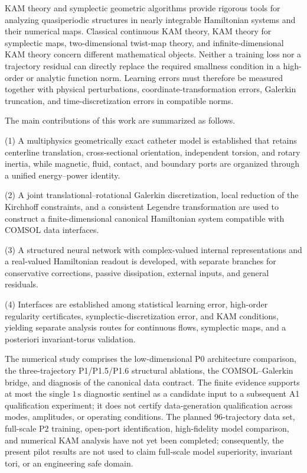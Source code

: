 KAM theory and symplectic geometric algorithms provide rigorous tools for analyzing quasiperiodic structures in nearly integrable Hamiltonian systems and their numerical maps\cite{FengQin2010,Shang1999KAMAlgorithms,Shang2000KAMMappings,Haro2016Parameterization,Arnold1989ClassicalMechanics,Coquinot2020Metriplectic,Moser1962InvariantCurves,Kuksin1993InfiniteDimensionalKAM,Poschel2001KAMLecture}. Classical continuous KAM theory, KAM theory for symplectic maps, two-dimensional twist-map theory, and infinite-dimensional KAM theory concern different mathematical objects. Neither a training loss nor a trajectory residual can directly replace the required smallness condition in a high-order or analytic function norm. Learning errors must therefore be measured together with physical perturbations, coordinate-transformation errors, Galerkin truncation, and time-discretization errors in compatible norms.

The main contributions of this work are summarized as follows.

(1) A multiphysics geometrically exact catheter model is established that retains centerline translation, cross-sectional orientation, independent torsion, and rotary inertia, while magnetic, fluid, contact, and boundary ports are organized through a unified energy--power identity.

(2) A joint translational--rotational Galerkin discretization, local reduction of the Kirchhoff constraints, and a consistent Legendre transformation are used to construct a finite-dimensional canonical Hamiltonian system compatible with COMSOL data interfaces.

(3) A structured neural network with complex-valued internal representations and a real-valued Hamiltonian readout is developed, with separate branches for conservative corrections, passive dissipation, external inputs, and general residuals.

(4) Interfaces are established among statistical learning error, high-order regularity certificates, symplectic-discretization error, and KAM conditions, yielding separate analysis routes for continuous flows, symplectic maps, and a posteriori invariant-torus validation.

The numerical study comprises the low-dimensional P0 architecture comparison, the three-trajectory P1/P1.5/P1.6 structural ablations, the COMSOL--Galerkin bridge, and diagnosis of the canonical data contract. The finite evidence supports at most the single \(1\,\mathrm{s}\) diagnostic sentinel as a candidate input to a subsequent A1 qualification experiment; it does not certify data-generation qualification across modes, amplitudes, or operating conditions. The planned 96-trajectory data set, full-scale P2 training, open-port identification, high-fidelity model comparison, and numerical KAM analysis have not yet been completed; consequently, the present pilot results are not used to claim full-scale model superiority, invariant tori, or an engineering safe domain.

